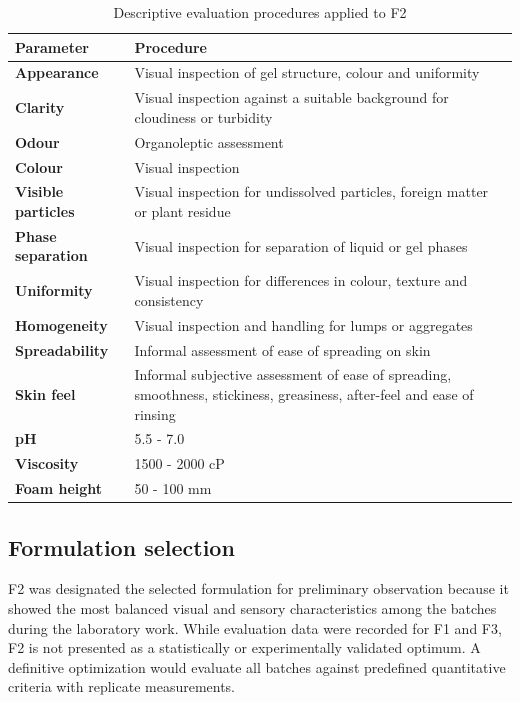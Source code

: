 \documentclass[10pt,a4paper,twocolumn]{article}
\begin{document}
\begin{table}[!htbp]
\centering

\renewcommand{\arraystretch}{1.3}
\begin{tabularx}{\textwidth}{>{\bfseries}lX}
\toprule
Parameter & Procedure \\
\midrule
Appearance        & Visual inspection of gel structure, colour and
                    uniformity \\
Clarity           & Visual inspection against a suitable background for
                    cloudiness or turbidity \\
Odour             & Organoleptic assessment \\
Colour            & Visual inspection \\
Visible particles & Visual inspection for undissolved particles, foreign
                    matter or plant residue \\
Phase separation  & Visual inspection for separation of liquid or gel
                    phases \\
Uniformity        & Visual inspection for differences in colour, texture
                    and consistency \\
Homogeneity       & Visual inspection and handling for lumps or
                    aggregates \\
Spreadability     & Informal assessment of ease of spreading on skin \\
Skin feel         & Informal subjective assessment of ease of spreading,
                    smoothness, stickiness, greasiness, after-feel and
                    ease of rinsing \\
pH                & 5.5 - 7.0  \\
Viscosity         & 1500 - 2000 cP \\
Foam height       & 50 - 100 mm \\
\bottomrule
\end{tabularx}
\caption{Descriptive evaluation procedures applied to F2}
\label{tab:evaluation}
\end{table}

\subsection{Formulation selection}

F2 was designated the selected formulation for preliminary
observation because it showed the most balanced visual and sensory
characteristics among the batches during the laboratory work. While
evaluation data were recorded for F1 and F3, F2 is not presented as a
statistically or experimentally validated optimum. A definitive
optimization would evaluate all batches against predefined quantitative
criteria with replicate measurements.
\end{document}
